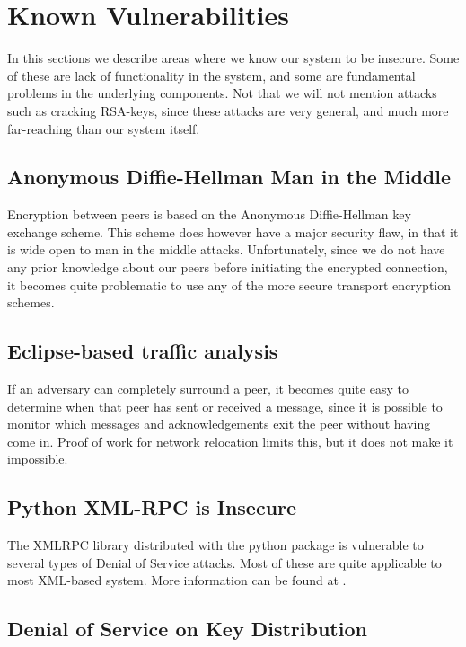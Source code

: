 \section{Known Vulnerabilities}

In this sections we describe areas where we know our system to be insecure. Some of these are lack of functionality in the system, and some are fundamental problems in the underlying components. Not that we will not mention attacks such as cracking RSA-keys, since these attacks are very general, and much more far-reaching than our system itself.

\subsection{Anonymous Diffie-Hellman Man in the Middle}

Encryption between peers is based on the Anonymous Diffie-Hellman key exchange scheme. This scheme does however have a major security flaw, in that it is wide open to man in the middle attacks. Unfortunately, since we do not have any prior knowledge about our peers before initiating the encrypted connection, it becomes quite problematic to use any of the more secure transport encryption schemes.

\subsection{Eclipse-based traffic analysis}

If an adversary can completely surround a peer, it becomes quite easy to determine when that peer has sent or received a message, since it is possible to monitor which messages and acknowledgements exit the peer without having come in.
Proof of work for network relocation limits this, but it does not make it impossible.

\subsection{Python XML-RPC is Insecure}

The XMLRPC library distributed with the python package is vulnerable to several types of Denial of Service attacks. Most of these are quite applicable to most XML-based system. More information can be found at \citep{XMLRPCBAD}.

\subsection{Denial of Service on Key Distribution}

